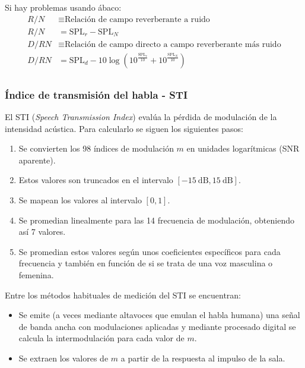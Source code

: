 \documentclass[a4paper, 8pt]{extarticle}
\begin{document}
\begin{multicols}{3}
  Si hay problemas usando ábaco:
  \begin{align*}
    R/N  & \equiv \text{Relación de campo reverberante a ruido}                                                \\
    R/N  & = \text{SPL}_r - \text{SPL}_N                                                                       \\
    D/RN & \equiv \text{Relación de campo directo a campo reverberante más ruido}                              \\
    D/RN & = \text{SPL}_d - 10 \log \left( 10^{\frac{\text{SPL}_r}{10}} + 10^{\frac{\text{SPL}_N}{10}} \right) \\
  \end{align*}
  \subsubsection{Índice de transmisión del habla - STI}

  El STI (\textit{Speech Transmission Index}) evalúa la pérdida de modulación de la intensidad acústica. Para calcularlo se siguen los siguientes pasos:
  \begin{enumerate}
    \item Se convierten los 98 índices de modulación $m$ en unidades logarítmicas (SNR aparente).
    \item Estos valores son truncados en el intervalo $\left[ \qty{-15}{\dB} , \qty{+15}{\dB}  \right]$.
    \item Se mapean los valores al intervalo $\left[ 0, 1 \right]$.
    \item Se promedian linealmente para las 14 frecuencia de modulación, obteniendo así 7 valores.
    \item Se promedian estos valores según unos coeficientes específicos para cada frecuencia y también en función de si se trata de una voz masculina o femenina.
  \end{enumerate}

  Entre los métodos habituales de medición del STI se encuentran:
  \begin{itemize}
    \item Se emite (a veces mediante altavoces que emulan el habla humana) una señal de banda ancha con modulaciones aplicadas y mediante procesado digital se calcula la intermodulación para cada valor de $m$.
    \item Se extraen los valores de $m$ a partir de la respuesta al impulso de la sala.
  \end{itemize}


\end{multicols}
\end{document}
